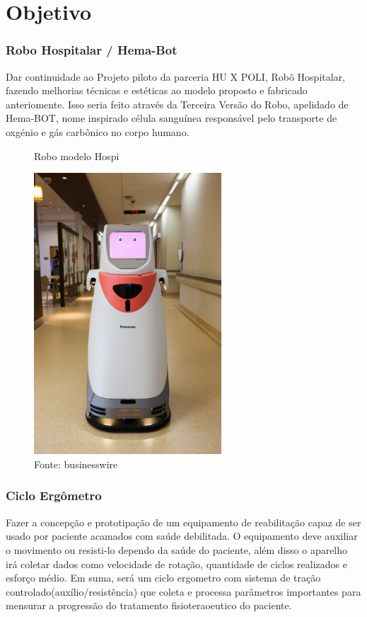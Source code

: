 \documentclass[../poliXuniversity_hospital_(USP)_report.tex]{subfiles}
\begin{document}
\chapter{Objetivo}

\subsection{Robo Hospitalar / Hema-Bot}

Dar continuidade ao Projeto piloto da parceria HU X POLI, Robô Hospitalar, fazendo melhorias técnicas e estéticas ao modelo proposto e fabricado anteriomente. Isso seria feito através da Terceira Versão do Robo, apelidado de Hema-BOT, nome inspirado célula sanguínea responsável pelo transporte de oxgénio e gás carbônico no corpo humano.

\begin{figure}[h]
\centering
    \caption{Robo modelo Hospi\cite{hospi}}
    \centering %
    \includegraphics[width=7cm]{images/hospi.jpg}
    \caption*{Fonte: businesswire}
    \label{fig: Robô Hospi}
\end{figure}

\subsection{Ciclo Ergômetro}

Fazer a concepção e prototipação de um equipamento de reabilitação capaz de ser usado por paciente acamados com saúde debilitada. O equipamento deve auxiliar o movimento ou resisti-lo dependo da saúde do paciente, além disso o aparelho irá coletar dados como velocidade de rotação, quantidade de ciclos realizados e esforço médio. Em suma, será um ciclo ergometro com sistema de tração controlado(auxílio/resistência) que coleta e processa parâmetros importantes para mensurar a progressão do tratamento fisioteraoeutico do paciente.
\end{document}
